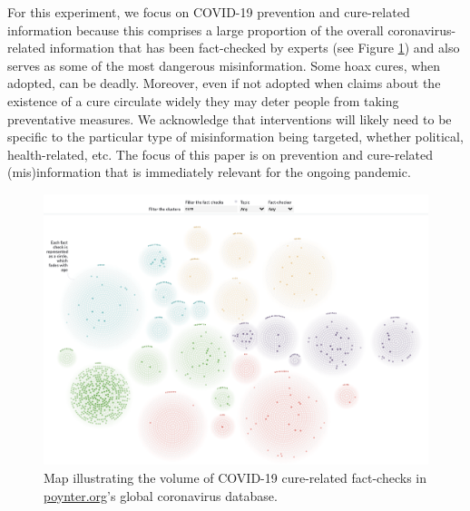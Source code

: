 \documentclass[letterpaper, 12pt, parskip=full,]{scrartcl}
\begin{document}
For this experiment, we focus on COVID-19 prevention and cure-related information because this comprises a large proportion of the overall coronavirus-related information that has been fact-checked by experts (see Figure \ref{fig:poynter_cures}) and also serves as some of the most dangerous misinformation. Some hoax cures, when adopted, can be deadly. Moreover, even if not adopted when claims about the existence of a cure circulate widely they may deter people from taking preventative measures. We acknowledge that interventions will likely need to be specific to the particular type of misinformation being targeted, whether political, health-related, etc. The focus of this paper is on prevention and cure-related (mis)information that is immediately relevant for the ongoing pandemic. 


\begin{figure}[!htb]
\centering
\caption{Map illustrating the volume of COVID-19 cure-related fact-checks in \url{poynter.org}'s global coronavirus database.}
\label{fig:poynter_cures}
\includegraphics[width=.95\textwidth]{figures/poynter_cures.png} 
\end{figure}
\end{document}

